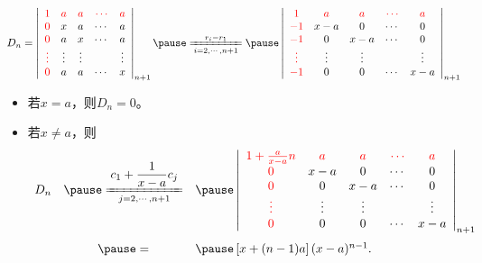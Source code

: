 \begin{frame}
  \begin{center}
  \end{center}
  \begin{small}
      $$
  D_n = \left|
  \begin{array}{ccccc}
    \red{1}   & \red{a}  & \red{a}  & \red{\cd} & \red{a}   \\
    \red{0}   & x  & a  & \cd & a   \\
    \red{0}   & a  & x  & \cd & a   \\
    \red{\vd} &\vd &\vd &     & \vd \\
    \red{0}   & a  & a  & \cd & x 
  \end{array}
  \right|_{n+1} \pause 
  \xlongequal[i=2,\cdots,n+1]{r_i-r_1} \pause 
  \left|
  \begin{array}{ccccc}
    \red{1}    & \red{a}  & \red{a} & \red{\cd} & \red{a}   \\
    \red{-1}   & x-a      &  0      & \cd & 0   \\
    \red{-1}   & 0        &  x-a    & \cd & 0   \\
    \red{\vd}  &\vd       & \vd     &     & \vd \\
    \red{-1}   & 0        &   0     & \cd & x-a 
  \end{array}
  \right|_{n+1}
  $$
  \pause 
  \begin{itemize}
  \item
    若$x=a$，则$D_n=0$。 \pause \\
  \item 
    若$x\ne a$，则
    $$
    \begin{array}{rcl}
    D_n & \pause \xlongequal[j=2,\cd,n+1]{\disp c_1+ \frac1{x-a}c_j} & \pause 
    \left|
    \begin{array}{ccccc}
      \red{1+\frac{a}{x-a}n}   & \red{a}  & \red{a}  & \red{\cd} & \red{a}   \\
      \red{0}   & x-a  & 0  & \cd & 0   \\
      \red{0}   & 0  & x-a  & \cd & 0   \\
      \red{\vd} &\vd &\vd &     & \vd \\
      \red{0}   & 0  & 0  & \cd & x-a
    \end{array}
    \right|_{n+1} \\[0.5in]
    & \pause = & \pause  \left[x+(n-1)a\right](x-a)^{n-1}.
    \end{array}
    $$
  \end{itemize}

  \end{small}
\end{frame}

